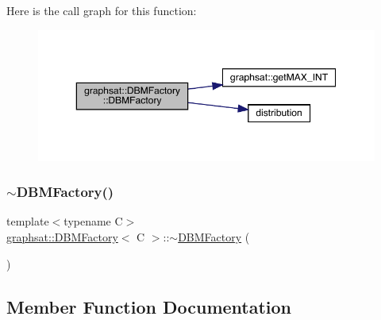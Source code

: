 Here is the call graph for this function\+:
\nopagebreak
\begin{figure}[H]
\begin{center}
\leavevmode
\includegraphics[width=350pt]{classgraphsat_1_1_d_b_m_factory_a92cb135d2bb3e22ba50de76107fdb8bd_cgraph}
\end{center}
\end{figure}
\mbox{\label{classgraphsat_1_1_d_b_m_factory_af0f3dde87f07df5d3c9f0f3a1d754425}} 
\subsubsection{\texorpdfstring{$\sim$DBMFactory()}{~DBMFactory()}}
{\footnotesize\ttfamily template$<$typename C$>$ \\
\mbox{\hyperlink{classgraphsat_1_1_d_b_m_factory}{graphsat\+::\+D\+B\+M\+Factory}}$<$ C $>$\+::$\sim$\mbox{\hyperlink{classgraphsat_1_1_d_b_m_factory}{D\+B\+M\+Factory}} (\begin{DoxyParamCaption}{ }\end{DoxyParamCaption})\hspace{0.3cm}{\ttfamily [inline]}}



\subsection{Member Function Documentation}
\mbox{\label{classgraphsat_1_1_d_b_m_factory_af2ab13a24914e31d8fc85f2d96fc38b2}} 
